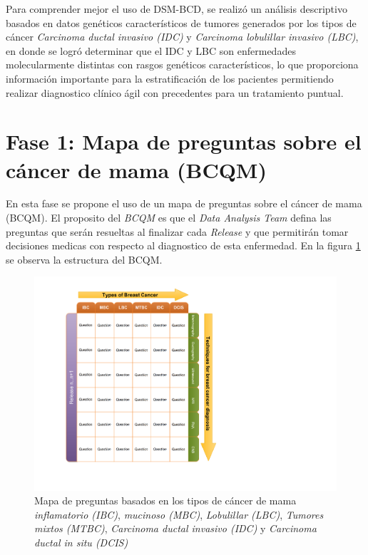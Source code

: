  Para comprender mejor el uso de DSM-BCD, se realizó un análisis descriptivo basados en datos genéticos característicos de tumores generados por los tipos de cáncer \textit{Carcinoma ductal invasivo (IDC)} y \textit{Carcinoma lobulillar invasivo (LBC)}, en donde se logró determinar que el IDC y LBC son enfermedades molecularmente distintas con rasgos genéticos característicos, lo que proporciona información importante para la estratificación de los pacientes permitiendo realizar diagnostico clínico ágil con precedentes para un tratamiento puntual.


\section{Fase 1: Mapa de preguntas sobre el cáncer de mama (BCQM)} 
En esta fase se propone el uso de un mapa de preguntas sobre el cáncer de mama (BCQM). El proposito del \textit{BCQM} es que el \textit{Data Analysis Team} defina las preguntas que serán resueltas al finalizar cada \textit{Release} y que permitirán tomar decisiones medicas con respecto al diagnostico de esta enfermedad. En la figura \ref{BCQM} se observa la estructura del BCQM.

\begin{figure}
	\centering
	\includegraphics[width=0.6
	\linewidth]{IMAGENES/BCQM}
	\caption{Mapa de preguntas basados en los tipos de cáncer de mama \textit{inflamatorio (IBC)}, \textit{mucinoso (MBC)}, \textit{Lobulillar (LBC)}, \textit{Tumores mixtos (MTBC)}, \textit{Carcinoma ductal invasivo (IDC)} y \textit{Carcinoma ductal in situ (DCIS)}}
	\label{BCQM}
\end{figure}

